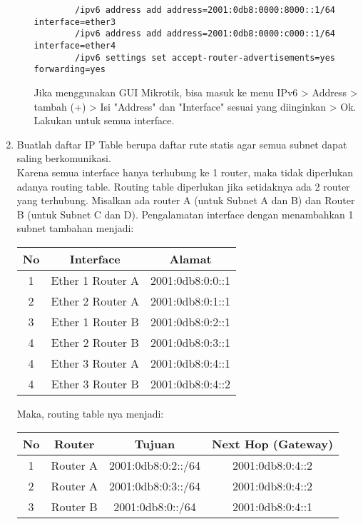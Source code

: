 \begin{enumerate}
\begin{enumerate}
\begin{tcolorbox}[colback=gray!10, colframe=black, title=IPv6 Configuration, fonttitle=\bfseries]
\begin{verbatim}
		/ipv6 address add address=2001:0db8:0000:8000::1/64 interface=ether3
		/ipv6 address add address=2001:0db8:0000:c000::1/64 interface=ether4
		/ipv6 settings set accept-router-advertisements=yes forwarding=yes
		\end{verbatim}
		\end{tcolorbox}
		Jika menggunakan GUI Mikrotik, bisa masuk ke menu IPv6 > Address > tambah (+) > Isi "Address" dan "Interface" sesuai yang diinginkan > Ok. Lakukan untuk semua interface.
	\end{enumerate}
	\item Buatlah daftar IP Table berupa daftar rute statis agar semua subnet dapat saling berkomunikasi.\\
	Karena semua interface hanya terhubung ke 1 router, maka tidak diperlukan adanya routing table. Routing table diperlukan jika setidaknya ada 2 router yang terhubung. Misalkan ada router A (untuk Subnet A dan B) dan Router B (untuk Subnet C dan D). Pengalamatan interface dengan menambahkan 1 subnet tambahan menjadi: \\
	\begin{table}[H]
		\centering
			\begin{tabular}{|c|c|c|}
				\hline
				No & Interface & Alamat \\ \hline
				1 & Ether 1 Router A & 2001:0db8:0:0::1 \\ \hline
				2 & Ether 2 Router A & 2001:0db8:0:1::1 \\ \hline
				3 & Ether 1 Router B & 2001:0db8:0:2::1 \\ \hline
				4 & Ether 2 Router B & 2001:0db8:0:3::1 \\ \hline
				4 & Ether 3 Router A & 2001:0db8:0:4::1 \\ \hline
				4 & Ether 3 Router B & 2001:0db8:0:4::2 \\ \hline
			\end{tabular}
	\end{table}
	Maka, routing table nya menjadi:\\
	\begin{table}[H]
		\centering
			\begin{tabular}{|c|c|c|c|}
				\hline
				No & Router & Tujuan & Next Hop (Gateway) \\ \hline
				1 & Router A & 2001:0db8:0:2::/64 & 2001:0db8:0:4::2 \\ \hline
				2 & Router A & 2001:0db8:0:3::/64 & 2001:0db8:0:4::2 \\ \hline
				3 & Router B & 2001:0db8:0::/64 & 2001:0db8:0:4::1 \\ \hline

\end{tabular}
\end{table}
\end{enumerate}
